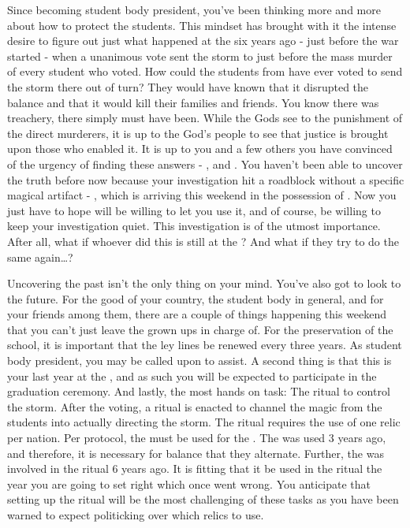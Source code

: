 \documentclass[char]{GL2020}
\begin{document}
Since becoming student body president, you’ve been thinking more and more about how to protect the students. This mindset has brought with it the intense desire to figure out just what happened at the \pSc{} six years ago - just before the war started - when a unanimous vote sent the storm to \pShip{} just before the mass murder of every student who voted. How could the students from \pShip{} have ever voted to send the storm there out of turn? They would have known that it disrupted the balance and that it would kill their families and friends. You know there was treachery, there simply must have been. While the Gods see to the punishment of the direct murderers, it is up to the God’s people to see that justice is brought upon those who enabled it. It is up to you and a few others you have convinced of the urgency of finding these answers - \cLibAssist{}, and \cHeir{}. You haven't been able to uncover the truth before now because your investigation hit a roadblock without a specific magical artifact - \iMirror{}, which is arriving this weekend in the possession of \cDiplomat{}. Now you just have to hope \cDiplomat{\they} will be willing to let you use it, and of course, be willing to keep your investigation quiet. This investigation is of the utmost importance. After all, what if whoever did this is still at the \pSc{}? And what if they try to do the same again\dots?

Uncovering the past isn't the only thing on your mind. You've also got to look to the future. For the good of your country, the student body in general, and for your friends among them, there are a couple of things happening this weekend that you can't just leave the grown ups in charge of. For the preservation of the school, it is important that the ley lines be renewed every three years. As student body president, you may be called upon to assist. A second thing is that this is your last year at the \pSc{}, and as such you will be expected to participate in the graduation ceremony. And lastly, the most hands on task: The ritual to control the storm. After the voting, a ritual is enacted to channel the magic from the students into actually directing the storm. The ritual requires the use of one relic per nation. Per protocol, the \iNet{} must be used for the \pShip{}. The \iChalice{} was used 3 years ago, and therefore, it is necessary for balance that they alternate. Further, the \iNet{} was involved in the ritual 6 years ago. It is fitting that it be used in the ritual the year you are going to set right which once went wrong. You anticipate that setting up the ritual will be the most challenging of these tasks as you have been warned to expect politicking over which relics to use.
\end{document}
